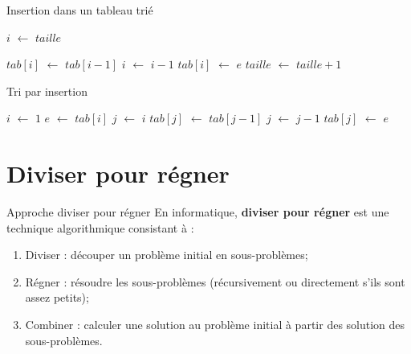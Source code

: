 \documentclass[10pt,xcolor=dvipsnames]{beamer}
\newcommand*\Let[2]{\State #1 $\gets$ #2}
\begin{document}
\begin{frame}{Insertion dans un tableau trié}
    \begin{tcolorbox}
  \begin{algorithmic}[1]
    \Let{$i$}{$taille$}

        \Let{$tab[i]$}{$tab[i - 1]$}
        \Let{$i$}{$i - 1$}
    \EndWhile
    \Let{$tab[i]$}{$e$}
    \Let{$taille$}{$taille + 1$}
    \EndFunction
  \end{algorithmic}
\end{tcolorbox}


\end{frame}

\begin{frame}{Tri par insertion}
    \begin{tcolorbox}
  \begin{algorithmic}[1]
    \Let{$i$}{$1$}
        \Let{$e$}{$tab[i]$}
        \Let{$j$}{$i$}
            \Let{$tab[j]$}{$tab[j - 1]$}
            \Let{$j$}{$j - 1$}
        \EndWhile
        \Let{$tab[j]$}{$e$}
    \EndFor
    \EndFunction
  \end{algorithmic}
\end{tcolorbox}


\end{frame}



\section{Diviser pour régner}
\begin{frame}{Approche diviser pour régner}
En informatique, \textbf{\alert{diviser pour régner}} est une technique algorithmique consistant à : 
  \begin{enumerate}
  \item \alert{Diviser} : découper un problème initial en sous-problèmes;
  \item \alert{Régner} : résoudre les sous-problèmes (récursivement ou directement s'ils sont assez petits);
  \item \alert{Combiner} : calculer une solution au problème initial à partir des solution des sous-problèmes.
  \end{enumerate}
  

  \end{frame}
 
\end{document}
